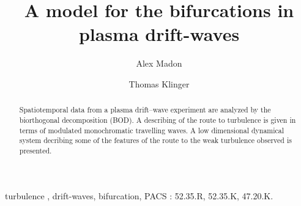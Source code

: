

\def\subfigureA#1{
\leavevmode
\hbox{#1}
}

\def\lsfig{
A01Hfour.eps
A02Hfour.eps
A03Hfour.eps
A04Hfour.eps
A05Hfour.eps
A06Hfour.eps
A07Hfour.eps
A08Hfour.eps
A09Hfour.eps
A10Hfour.eps
poidsforme.eps
lock.eps

}




\begin{frontmatter}

\title {A model for the bifurcations in plasma drift-waves}
\author {Alex Madon}
\address {CNRS, Centre de Physique Th\'eorique, Luminy,
         Case 907, F-13288 Marseille, France, 
         madon@cpt.univ-mrs.fr}
\author{Thomas Klinger}
\address{Institut f\"ur Experimentalphysik, 
Christian-Albrechts-Universit\"at,
Kiel, Olshausenstrasse 40-60, D-24098 Kiel, Germany}

\begin{abstract}
Spatiotemporal data from a plasma drift--wave experiment are analyzed
by the biorthogonal decomposition (BOD). A describing of the route
to turbulence is given in terms of  modulated monochromatic 
travelling waves.
A low dimensional dynamical system decribing some of the features 
of the route to the weak turbulence observed is presented.
\end{abstract}

\begin{keyword} turbulence , drift-waves, 
bifurcation,
PACS : 52.35.R, 52.35.K, 47.20.K.
\end{keyword}
\end{frontmatter}

